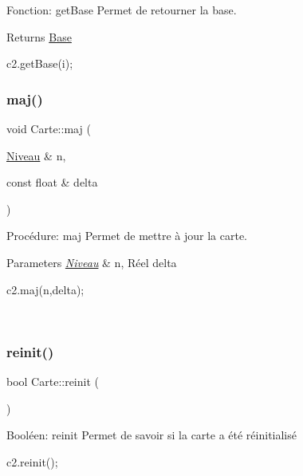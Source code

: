 Fonction\+: get\+Base Permet de retourner la base. 

\begin{DoxyReturn}{Returns}
\hyperlink{classBase}{Base} 
\begin{DoxyCode}
c2.getBase(i);
\end{DoxyCode}
 
\end{DoxyReturn}
\mbox{\label{classCarte_acab09788089999f806da300dd9b162ff}} 
\subsubsection{\texorpdfstring{maj()}{maj()}}
{\footnotesize\ttfamily void Carte\+::maj (\begin{DoxyParamCaption}\item[{\hyperlink{classNiveau}{Niveau} \&}]{n,  }\item[{const float \&}]{delta }\end{DoxyParamCaption})}



Procédure\+: maj Permet de mettre à jour la carte. 


\begin{DoxyParams}{Parameters}
{\em \hyperlink{classNiveau}{Niveau}} & n, Réel delta 
\begin{DoxyCode}
c2.maj(n,delta);
\end{DoxyCode}
 \\
\hline
\end{DoxyParams}
\mbox{\label{classCarte_a80741d7228490a91565f33977355da92}} 
\subsubsection{\texorpdfstring{reinit()}{reinit()}}
{\footnotesize\ttfamily bool Carte\+::reinit (\begin{DoxyParamCaption}{ }\end{DoxyParamCaption})}



Booléen\+: reinit Permet de savoir si la carte a été réinitialisé 


\begin{DoxyCode}
c2.reinit();
\end{DoxyCode}
 \mbox{\label{classCarte_a66c41e01a4a8730630bd77b6dd1b670e}} 
